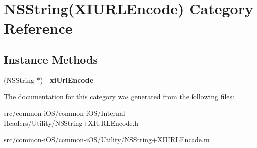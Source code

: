 \hypertarget{category_n_s_string_07_x_i_u_r_l_encode_08}{}\section{N\+S\+String(X\+I\+U\+R\+L\+Encode) Category Reference}
\label{category_n_s_string_07_x_i_u_r_l_encode_08}
\subsection*{Instance Methods}
\begin{DoxyCompactItemize}
\item 
\hypertarget{category_n_s_string_07_x_i_u_r_l_encode_08_a432cf25648d07360d6173c2ebf841a65}{}\label{category_n_s_string_07_x_i_u_r_l_encode_08_a432cf25648d07360d6173c2ebf841a65} 
(N\+S\+String $\ast$) -\/ {\bfseries xi\+Url\+Encode}
\end{DoxyCompactItemize}


The documentation for this category was generated from the following files\+:\begin{DoxyCompactItemize}
\item 
src/common-\/i\+O\+S/common-\/i\+O\+S/\+Internal Headers/\+Utility/N\+S\+String+\+X\+I\+U\+R\+L\+Encode.\+h\item 
src/common-\/i\+O\+S/common-\/i\+O\+S/\+Utility/N\+S\+String+\+X\+I\+U\+R\+L\+Encode.\+m\end{DoxyCompactItemize}
